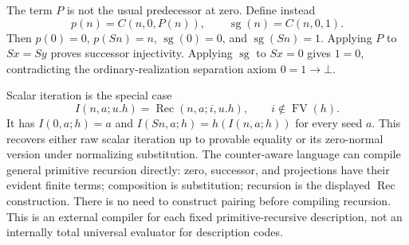 The term $P$ is not the usual predecessor at zero. Define instead
\[
 p(n)=C(n,0,P(n)),\qquad \operatorname{sg}(n)=C(n,0,1).
\]
Then $p(0)=0$, $p(Sn)=n$, $\operatorname{sg}(0)=0$, and
$\operatorname{sg}(Sn)=1$. Applying $P$ to $Sx=Sy$ proves
successor injectivity. Applying $\operatorname{sg}$ to $Sx=0$ gives
$1=0$, contradicting the ordinary-realization separation axiom
$0=1\to\bot$.

Scalar iteration is the special case
\[
 I(n,a;u.h)=\operatorname{Rec}(n,a;i,u.h),
 \qquad i\notin\operatorname{FV}(h).
\]
It has $I(0,a;h)=a$ and $I(Sn,a;h)=h(I(n,a;h))$ for every seed $a$.
This recovers either raw scalar iteration up to provable equality or its
zero-normal version under normalizing substitution. The counter-aware
language can compile general primitive recursion directly: zero,
successor, and projections have their evident finite terms; composition is
substitution; recursion is the displayed $\operatorname{Rec}$ construction.
There is no need to construct pairing before compiling recursion.
This is an external compiler for each fixed primitive-recursive description,
not an internally total universal evaluator for description codes.

